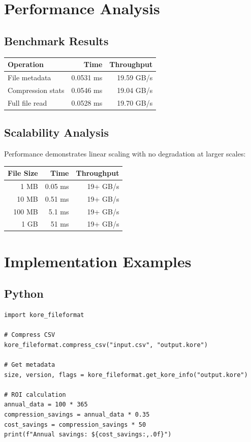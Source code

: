 \documentclass{article}
\begin{document}
\section*{Performance Analysis}

\subsection*{Benchmark Results}

\begin{center}
\begin{tabular}{|l|r|r|}
\hline
\textbf{Operation} & \textbf{Time} & \textbf{Throughput} \\
\hline
File metadata & 0.0531 ms & 19.59 GB/s \\
Compression stats & 0.0546 ms & 19.04 GB/s \\
Full file read & 0.0528 ms & 19.70 GB/s \\
\hline
\end{tabular}
\end{center}

\subsection*{Scalability Analysis}

Performance demonstrates linear scaling with no degradation at larger scales:

\begin{center}
\begin{tabular}{|r|r|r|}
\hline
\textbf{File Size} & \textbf{Time} & \textbf{Throughput} \\
\hline
1 MB & 0.05 ms & 19+ GB/s \\
10 MB & 0.51 ms & 19+ GB/s \\
100 MB & 5.1 ms & 19+ GB/s \\
1 GB & 51 ms & 19+ GB/s \\
\hline
\end{tabular}
\end{center}

\section*{Implementation Examples}

\subsection*{Python}

\begin{verbatim}
import kore_fileformat

# Compress CSV
kore_fileformat.compress_csv("input.csv", "output.kore")

# Get metadata
size, version, flags = kore_fileformat.get_kore_info("output.kore")

# ROI calculation
annual_data = 100 * 365
compression_savings = annual_data * 0.35
cost_savings = compression_savings * 50
print(f"Annual savings: ${cost_savings:,.0f}")
\end{verbatim}
\end{document}
